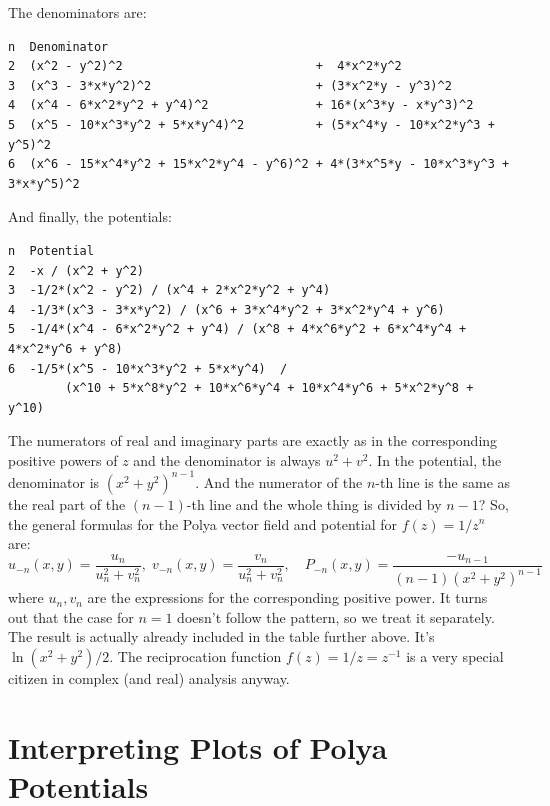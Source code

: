 \documentclass[12pt]{article}
\begin{document}
The denominators are:
\begin{verbatim}
n  Denominator
2  (x^2 - y^2)^2                           +  4*x^2*y^2
3  (x^3 - 3*x*y^2)^2                       + (3*x^2*y - y^3)^2
4  (x^4 - 6*x^2*y^2 + y^4)^2               + 16*(x^3*y - x*y^3)^2
5  (x^5 - 10*x^3*y^2 + 5*x*y^4)^2          + (5*x^4*y - 10*x^2*y^3 + y^5)^2
6  (x^6 - 15*x^4*y^2 + 15*x^2*y^4 - y^6)^2 + 4*(3*x^5*y - 10*x^3*y^3 + 3*x*y^5)^2
\end{verbatim}
And finally, the potentials:
\begin{verbatim}
n  Potential
2  -x / (x^2 + y^2)
3  -1/2*(x^2 - y^2) / (x^4 + 2*x^2*y^2 + y^4)
4  -1/3*(x^3 - 3*x*y^2) / (x^6 + 3*x^4*y^2 + 3*x^2*y^4 + y^6)
5  -1/4*(x^4 - 6*x^2*y^2 + y^4) / (x^8 + 4*x^6*y^2 + 6*x^4*y^4 + 4*x^2*y^6 + y^8)
6  -1/5*(x^5 - 10*x^3*y^2 + 5*x*y^4)  / 
        (x^10 + 5*x^8*y^2 + 10*x^6*y^4 + 10*x^4*y^6 + 5*x^2*y^8 + y^10)
\end{verbatim}
The numerators of real and imaginary parts are exactly as in the corresponding positive powers of $z$ and the denominator is always $u^2 + v^2$. In the potential, the denominator is $(x^2 + y^2)^{n-1}$. And the numerator of the $n$-th line is the same as the real part of the $(n-1)$-th line and the whole thing is divided by $n-1$?  So, the general formulas for the Polya vector field and potential for $f(z) = 1/z^n$ are:
\begin{equation}
\label{Eq:PolyaFieldNegativePowers}
\boxed
{		
u_{-n}(x,y) = \frac{u_n}{u_n^2 + v_n^2} ,\;
v_{-n}(x,y) = \frac{v_n}{u_n^2 + v_n^2} ,\quad
P_{-n}(x,y) = \frac{-u_{n-1}}{(n-1)(x^2+y^2)^{n-1}}
}
\end{equation}
where $u_n, v_n$ are the expressions for the corresponding positive power. It turns out that the case for $n=1$ doesn't follow the pattern, so we treat it separately. The result is actually already included in the table further above. It's $\ln(x^2+y^2)/2$. The reciprocation function $f(z) = 1/z = z^{-1}$ is a very special citizen in complex (and real) analysis anyway.


\section{Interpreting Plots of Polya Potentials}
\end{document}
